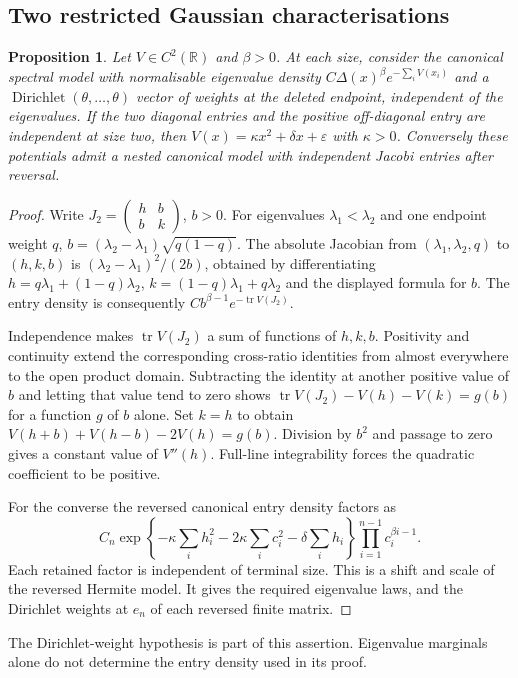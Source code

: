 \documentclass[10pt]{amsart}
\newtheorem{proposition}[theorem]{Proposition}
\DeclareMathOperator{\tr}{tr}
\DeclareMathOperator{\Dir}{Dirichlet}
\newcommand{\R}{\mathbb R}
\begin{document}
\subsection{Two restricted Gaussian characterisations}
\begin{proposition}\label{prop:canonical}
Let $V\in C^2(\R)$ and $\beta>0$. At each size, consider the
canonical spectral model with normalisable eigenvalue density
$C\Delta(x)^\beta e^{-\sum_i V(x_i)}$ and a $\Dir(\theta,\ldots,\theta)$ vector of weights at the deleted
endpoint, independent of the eigenvalues. If the two diagonal entries and
the positive off-diagonal entry are independent at size two, then
$V(x)=\kappa x^2+\delta x+\varepsilon$ with $\kappa>0$.
Conversely these potentials admit a nested canonical model with
independent Jacobi entries after reversal.
\end{proposition}
\begin{proof}
Write $J_2=\left(\begin{smallmatrix}h&b\\b&k\end{smallmatrix}\right)$,
$b>0$. For eigenvalues $\lambda_1<\lambda_2$ and one endpoint
weight $q$, $b=(\lambda_2-\lambda_1)\sqrt{q(1-q)}$.
The absolute Jacobian from $(\lambda_1,\lambda_2,q)$ to $(h,k,b)$
is $(\lambda_2-\lambda_1)^2/(2b)$, obtained by differentiating
$h=q\lambda_1+(1-q)\lambda_2$, $k=(1-q)\lambda_1+q\lambda_2$
and the displayed formula for $b$.
The entry density is consequently
$Cb^{\beta-1}e^{-\tr V(J_2)}$.

Independence makes $\tr V(J_2)$ a sum of functions of $h,k,b$.
Positivity and continuity extend the corresponding cross-ratio
identities from almost everywhere to the open product domain.
Subtracting the identity at another positive value of $b$ and
letting that value tend to zero shows
$\tr V(J_2)-V(h)-V(k)=g(b)$ for a function $g$ of $b$ alone.
Set $k=h$ to obtain
$V(h+b)+V(h-b)-2V(h)=g(b)$. Division by $b^2$ and passage to
zero gives a constant value of $V''(h)$. Full-line integrability
forces the quadratic coefficient to be positive.

For the converse the reversed canonical entry density factors as
\[
 C_n\exp\left\{-\kappa\sum_i h_i^2-2\kappa\sum_i c_i^2
                    -\delta\sum_i h_i\right\}
 \prod_{i=1}^{n-1}c_i^{\beta i-1}.
\]
Each retained factor is independent of terminal size. This is a
shift and scale of the reversed Hermite model. It gives the required
eigenvalue laws, and the Dirichlet weights at $e_n$ of each reversed
finite matrix.
\end{proof}
The Dirichlet-weight hypothesis is part of this assertion.
Eigenvalue marginals alone do not determine the entry density used
in its proof.
\end{document}
